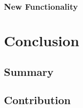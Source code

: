 \documentclass{l4proj}
\begin{document}
\subsection{New Functionality}


\chapter{Conclusion}

\section{Summary}


\section{Contribution}




\end{document}
